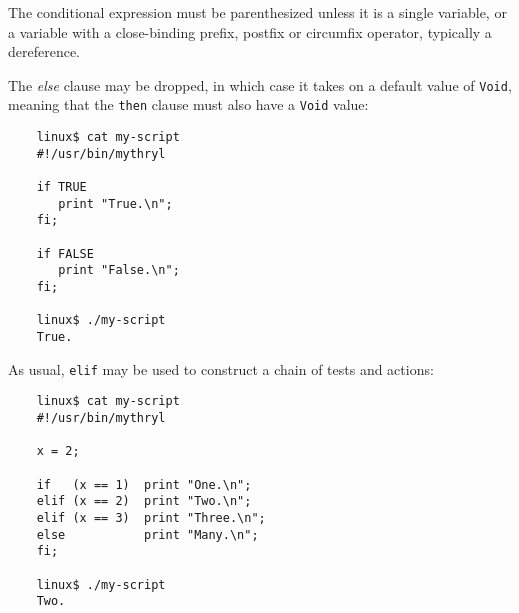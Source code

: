 The conditional expression must be parenthesized 
unless it is a single variable, or a variable 
with a close-binding prefix, postfix or circumfix 
operator, typically a dereference.

The {\it else} clause may be dropped, in which case 
it takes on a default value of {\tt Void}, meaning 
that the {\tt then} clause must also have a {\tt Void} 
value:

\begin{verbatim}
    linux$ cat my-script 
    #!/usr/bin/mythryl

    if TRUE
       print "True.\n";
    fi;

    if FALSE
       print "False.\n";
    fi;

    linux$ ./my-script
    True.
\end{verbatim}

As usual, {\tt elif} may be used to construct 
a chain of tests and actions:

\begin{verbatim}
    linux$ cat my-script 
    #!/usr/bin/mythryl

    x = 2;

    if   (x == 1)  print "One.\n";
    elif (x == 2)  print "Two.\n";
    elif (x == 3)  print "Three.\n";
    else           print "Many.\n";
    fi;

    linux$ ./my-script
    Two.
\end{verbatim}

\cutend*


